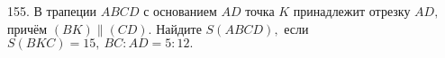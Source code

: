 155. В трапеции $ABCD$ с основанием $AD$ точка $K$ принадлежит отрезку $AD,$ причём $(BK)\parallel(CD).$ Найдите $S(ABCD),$ если $S(BKC)=15,\ BC:AD=5:12.$\\
